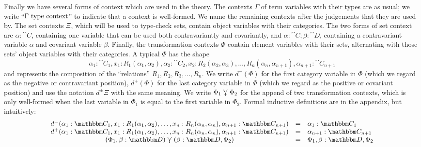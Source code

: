 \documentclass{llncs}
\begin{document}
Finally we have several forms of context which are used in the theory.
The contexts $\Gamma$ of term variables with their types are as usual;
we write ``${\Gamma \,\,\textrm{type context}}$'' to indicate that a context is well-formed.
We name the remaining contexts after the judgements that they are used
by. The set contexts $\Xi$, which will be used
to type-check sets, contain object variables with their categories. The
two forms of set context are $\alpha : \cat C$, containing one variable
that can be used both contravariantly and covariantly, and $\alpha :
\cat C ; \beta : \cat D$, containing a contravariant variable $\alpha$
and covariant variable $\beta$.  Finally, the transformation contexts
$\Phi$ contain element variables with their sets, alternating with those
sets' object variables with their categories.  A typical $\Phi$ has the
shape
\[
\alpha_1 : \cat C_1, x_1:R_1(\alpha_1,\alpha_2), \alpha_2 : \cat C_2,
x_2:R_2(\alpha_2,\alpha_3), \ldots, R_n(\alpha_n,\alpha_{n+1}),
\alpha_{n+1} : \cat C_{n+1}
\]
and represents the composition of the ``relations'' $R_1, R_2, R_3,
\ldots, R_n$.  We write $d^-(\Phi)$ for the first category variable in
$\Phi$ (which we regard as the negative or contravariant position),
$d^+(\Phi)$ for the last category variable in $\Phi$ (which we regard
as the positive or covariant position) and use the notation $d^\pm\Xi$
with the same meaning. We write $\Phi_1 \curlyveedownarrow \Phi_2$ for the append
of two transformation contexts, which is only well-formed when the
last variable in $\Phi_1$ is equal to the first variable in
$\Phi_2$. Formal inductive definitions are in the appendix, but
intuitively:
\[
\begin{array}{ccl}
d^-(\alpha_1 : \cat C_1, x_1:R_1(\alpha_1,\alpha_2), \ldots, x_n:R_n(\alpha_n,\alpha_n), \alpha_{n+1} : \cat C_{n+1}) & = & \alpha_1 : \cat C_1\\
d^+(\alpha_1 : \cat C_1, x_1:R_1(\alpha_1,\alpha_2), \ldots, x_n:R_n(\alpha_n,\alpha_n), \alpha_{n+1} : \cat C_{n+1}) & = & \alpha_{n+1}:\cat C_{n+1}\\
(\Phi_1,\beta:\cat D) \jnctx (\beta:\cat D, \Phi_2) & = & \Phi_1, \beta : \cat D, \Phi_2
\end{array}
\]
\end{document}
